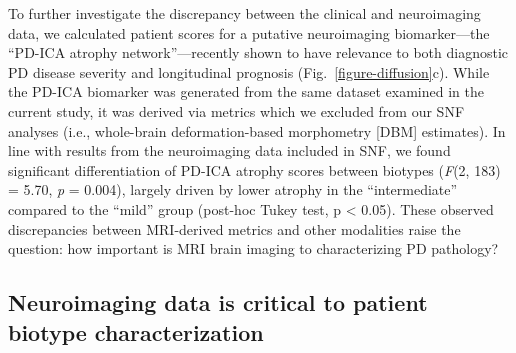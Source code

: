 \documentclass[12pt,aps,pra,reprint,showkeys]{revtex4-1}
\begin{document}
To further investigate the discrepancy between the clinical and neuroimaging data, we calculated patient scores for a putative neuroimaging biomarker---the ``PD-ICA atrophy network''---recently shown to have relevance to both diagnostic PD disease severity and longitudinal prognosis \citep{zeighami2019mri} (Fig.~\ref{figure-diffusion}c).
While the PD-ICA biomarker was generated from the same dataset examined in the current study, it was derived via metrics which we excluded from our SNF analyses (i.e., whole-brain deformation-based morphometry [DBM] estimates).
In line with results from the neuroimaging data included in SNF, we found significant differentiation of PD-ICA atrophy scores between biotypes (\emph{F}(2, 183) = 5.70, \emph{p} = 0.004), largely driven by lower atrophy in the ``intermediate'' compared to the ``mild'' group (post-hoc Tukey test, p < 0.05).
These observed discrepancies between MRI-derived metrics and other modalities raise the question: how important is MRI brain imaging to characterizing PD pathology?

\subsection*{Neuroimaging data is critical to patient biotype characterization}
\end{document}
